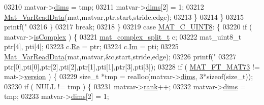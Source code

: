 \begin{DoxyCode}
{{{{{{{{{{{{{{{{{{{{{{{{{{{{{{{{{{{{{{{{{{{{{{{{{{{{{{{03210                                 matvar->\hyperlink{group___m_a_t_a8e01234e1c862ce3472bb37f5a09b92c}{dims} = tmp;
03211                                 matvar->\hyperlink{group___m_a_t_a8e01234e1c862ce3472bb37f5a09b92c}{dims}[2] = 1;
03212                                 \hyperlink{group___m_a_t_ga1845000f4fc6252ec5ff11c4b9f0759f}{Mat\_VarReadData}(mat,matvar,ptr,start,stride,edge);
03213                             \}
03214                         \}
03215                         printf(\textcolor{stringliteral}{"%
03216                     \}
03217                     \textcolor{keywordflow}{break};
03218                 \}
03219                 \textcolor{keywordflow}{case} \hyperlink{group___m_a_t_ggad4d60ae7b709fc81bfd744fb4c857c40a81270f8093cb4808e992c1d29d84d4e3}{MAT\_C\_UINT8}: \{
03220                     \textcolor{keywordflow}{if} ( matvar->\hyperlink{group___m_a_t_aeb03b3a69f108dc05470b00443a43739}{isComplex} ) \{
03221                         \hyperlink{group___m_a_t_structmat__complex__split__t}{mat\_complex\_split\_t} c;
03222                         mat\_uint8\_t ptr[4], pti[4];
03223                         c.\hyperlink{group___m_a_t_a484a93607508adac2bce53a0252e0325}{Re} = ptr;
03224                         c.\hyperlink{group___m_a_t_a7182d10b0d3598415887376065440946}{Im} = pti;
03225                         \hyperlink{group___m_a_t_ga1845000f4fc6252ec5ff11c4b9f0759f}{Mat\_VarReadData}(mat,matvar,&c,start,stride,edge);
03226                         printf(\textcolor{stringliteral}{"%
03227                             ptr[0],pti[0],ptr[2],pti[2],ptr[1],pti[1],ptr[3],pti[3]);
03228                         \textcolor{keywordflow}{if} ( \hyperlink{group___m_a_t_ggad03442b8378999189d510e3745c702b7a765c5d1d5038947646260dc82483517e}{MAT\_FT\_MAT73} != mat->\hyperlink{struct__mat__t_a729c2bc0afc97485057a5af425635b1a}{version} ) \{
03229                             \textcolor{keywordtype}{size\_t} *tmp = realloc(matvar->\hyperlink{group___m_a_t_a8e01234e1c862ce3472bb37f5a09b92c}{dims}, 3*\textcolor{keyword}{sizeof}(\textcolor{keywordtype}{size\_t}));
03230                             \textcolor{keywordflow}{if} ( NULL != tmp ) \{
03231                                 matvar->\hyperlink{group___m_a_t_a84ba70c96ded13cc555fa75b768d9921}{rank}++;
03232                                 matvar->\hyperlink{group___m_a_t_a8e01234e1c862ce3472bb37f5a09b92c}{dims} = tmp;
03233                                 matvar->\hyperlink{group___m_a_t_a8e01234e1c862ce3472bb37f5a09b92c}{dims}[2] = 1;
}}}}}}}}}}}}}}}}}}}}}}}}}}}}}}}}}}}}}}}}}}}}}}}}}}}}}}}}}
\end{DoxyCode}

